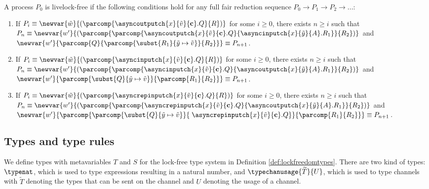 \begin{defi}
    A process $P_0$ is livelock-free if the following conditions hold for any full fair reduction sequence $P_0 \longrightarrow P_1 \longrightarrow P_2 \longrightarrow ...$:
    
    \begin{enumerate}%
        \item If $P_i \equiv \newvar{\tilde{w}}{(\parcomp{\asyncoutputch{x}{\tilde{v}}{\mathbf{c}}.Q}{R})}$ for some $i \geq 0$, there exists $n \geq i$ such that $P_n \equiv \newvar{w'}{(\parcomp{\parcomp{\asyncoutputch{x}{\tilde{v}}{\mathbf{c}}.Q}{\asyncinputch{x}{\tilde{y}}{A}.R_1}}{R_2})}$ and $\newvar{w'}{\parcomp{Q}{\parcomp{\subst{R_1}{\tilde{y} \mapsto \tilde{v}}}{R_2}}} \equiv P_{n+1}$.
        
        \item If $P_i \equiv \newvar{\tilde{w}}{(\parcomp{\asyncinputch{x}{\tilde{v}}{\mathbf{c}}.Q}{R})}$ for some $i \geq 0$, there exists $n \geq i$ such that $P_n \equiv \newvar{w'}{(\parcomp{\parcomp{\asyncinputch{x}{\tilde{v}}{\mathbf{c}}.Q}{\asyncoutputch{x}{\tilde{y}}{A}.R_1}}{R_2})}$ and $\newvar{w'}{\parcomp{\subst{Q}{\tilde{y} \mapsto \tilde{v}}}{\parcomp{R_1}{R_2}}} \equiv P_{n+1}$.
        
        \item If $P_i \equiv \newvar{\tilde{w}}{(\parcomp{\asyncrepinputch{x}{\tilde{v}}{\mathbf{c}}.Q}{R})}$ for some $i \geq 0$, there exists $n \geq i$ such that $P_n \equiv \newvar{w'}{(\parcomp{\parcomp{\asyncrepinputch{x}{\tilde{v}}{\mathbf{c}}.Q}{\asyncoutputch{x}{\tilde{y}}{A}.R_1}}{R_2})}$ and $\newvar{w'}{\parcomp{\parcomp{\subst{Q}{\tilde{y} \mapsto \tilde{v}}}{\;\asyncrepinputch{x}{\tilde{v}}{\mathbf{c}}.Q}}{\parcomp{R_1}{R_2}}} \equiv P_{n+1}$.
    \end{enumerate}
    \label{def:lockfreedomlockfreedom}
\end{defi}

\subsection{Types and type rules}

We define types with metavariables $T$ and $S$ for the lock-free type system in Definition \ref{def:lockfreedomtypes}. There are two kind of types: $\typenat$, which is used to type expressions resulting in a natural number, and $\typechanusage{\widetilde{T}}{U}$, which is used to type channels with $\widetilde{T}$ denoting the types that can be sent on the channel and $U$ denoting the usage of a channel.\\

